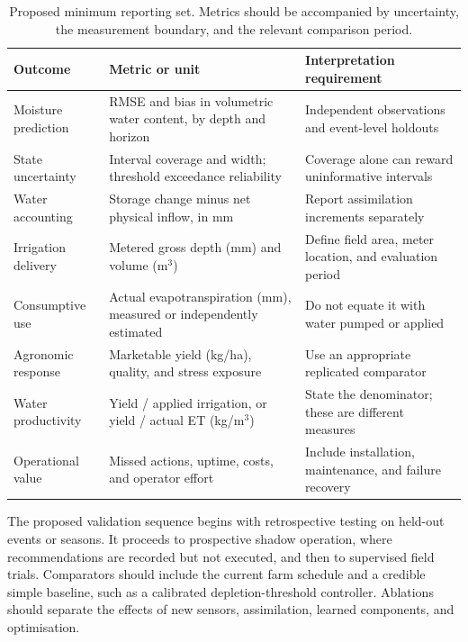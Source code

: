 \documentclass[acmsmall,screen,nonacm]{acmart}
\begin{document}
\begin{table}[!htbp]
\caption{Proposed minimum reporting set. Metrics should be accompanied by uncertainty, the measurement boundary, and the relevant comparison period.}
\label{tab:2}
\centering
\small
\begin{tabular}{>{\raggedright\arraybackslash}p{}>{\raggedright\arraybackslash}p{}>{\raggedright\arraybackslash}p{}}
\toprule
\textbf{Outcome} & \textbf{Metric or unit} & \textbf{Interpretation requirement} \\
\midrule
Moisture prediction & RMSE and bias in volumetric water content, by depth and horizon & Independent observations and event-level holdouts \\
State uncertainty & Interval coverage and width; threshold exceedance reliability & Coverage alone can reward uninformative intervals \\
Water accounting & Storage change minus net physical inflow, in mm & Report assimilation increments separately \\
Irrigation delivery & Metered gross depth (mm) and volume (m\ensuremath{^3}) & Define field area, meter location, and evaluation period \\
Consumptive use & Actual evapotranspiration (mm), measured or independently estimated & Do not equate it with water pumped or applied \\
Agronomic response & Marketable yield (kg/ha), quality, and stress exposure & Use an appropriate replicated comparator \\
Water productivity & Yield / applied irrigation, or yield / actual ET (kg/m\ensuremath{^3}) & State the denominator; these are different measures \\
Operational value & Missed actions, uptime, costs, and operator effort & Include installation, maintenance, and failure recovery \\
\bottomrule
\end{tabular}

\end{table}

The proposed validation sequence begins with retrospective testing on held-out events or seasons. It proceeds to prospective shadow operation, where recommendations are recorded but not executed, and then to supervised field trials. Comparators should include the current farm schedule and a credible simple baseline, such as a calibrated depletion-threshold controller. Ablations should separate the effects of new sensors, assimilation, learned components, and optimisation.
\end{document}
